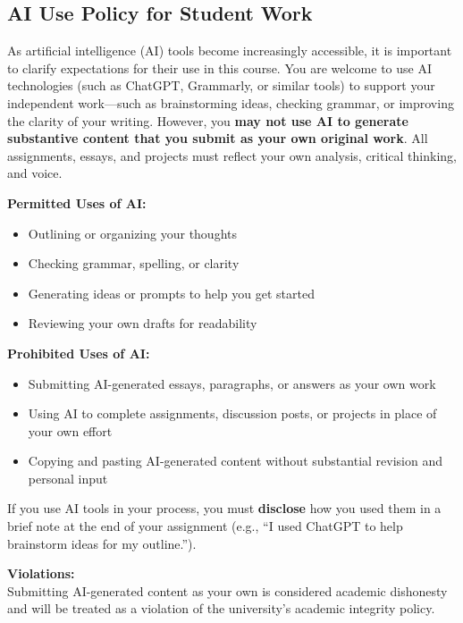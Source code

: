 \documentclass[]{tufte-handout}
\providecommand{\tightlist}{%
  \setlength{\itemsep}{0pt}\setlength{\parskip}{0pt}}
\begin{document}
\hypertarget{ai-use-policy-for-student-work}{%
\subsection{AI Use Policy for Student
Work}\label{ai-use-policy-for-student-work}}

As artificial intelligence (AI) tools become increasingly accessible, it
is important to clarify expectations for their use in this course. You
are welcome to use AI technologies (such as ChatGPT, Grammarly, or
similar tools) to support your independent work---such as brainstorming
ideas, checking grammar, or improving the clarity of your writing.
However, you \textbf{may not use AI to generate substantive content that
you submit as your own original work}. All assignments, essays, and
projects must reflect your own analysis, critical thinking, and voice.

\textbf{Permitted Uses of AI:}

\begin{itemize}
\tightlist
\item
  Outlining or organizing your thoughts
\item
  Checking grammar, spelling, or clarity
\item
  Generating ideas or prompts to help you get started
\item
  Reviewing your own drafts for readability
\end{itemize}

\textbf{Prohibited Uses of AI:}

\begin{itemize}
\tightlist
\item
  Submitting AI-generated essays, paragraphs, or answers as your own
  work
\item
  Using AI to complete assignments, discussion posts, or projects in
  place of your own effort
\item
  Copying and pasting AI-generated content without substantial revision
  and personal input
\end{itemize}

If you use AI tools in your process, you must \textbf{disclose} how you
used them in a brief note at the end of your assignment (e.g., ``I used
ChatGPT to help brainstorm ideas for my outline.'').

\textbf{Violations:}\\
Submitting AI-generated content as your own is considered academic
dishonesty and will be treated as a violation of the university's
academic integrity policy.
\end{document}
